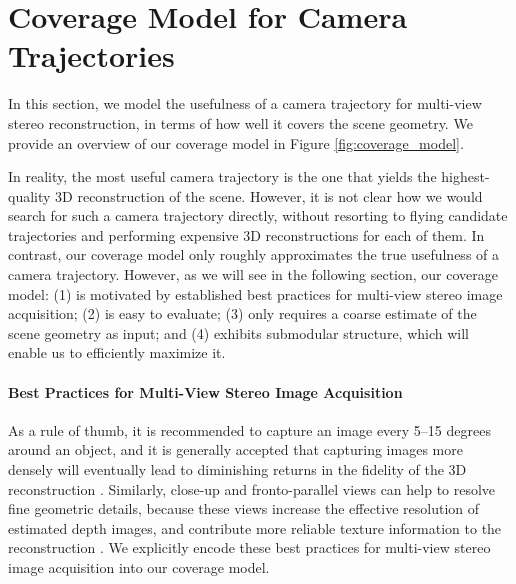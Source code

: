 \vspace{-5pt}
\section{Coverage Model for Camera Trajectories}
\label{sec:coverage_model}

In this section, we model the usefulness of a camera trajectory for multi-view stereo reconstruction, in terms of how well it covers the scene geometry.
We provide an overview of our coverage model in Figure \ref{fig:coverage_model}.

In reality, the most useful camera trajectory is the one that yields the highest-quality 3D reconstruction of the scene.
However, it is not clear how we would search for such a camera trajectory directly, without resorting to flying candidate trajectories and performing expensive 3D reconstructions for each of them.
In contrast, our coverage model only roughly approximates the true usefulness of a camera trajectory. 
However, as we will see in the following section, our coverage model: (1) is motivated by established best practices for multi-view stereo image acquisition; (2) is easy to evaluate; (3) only requires a coarse estimate of the scene geometry as input;  and (4) exhibits submodular structure, which will enable us to efficiently maximize it.

\vspace{-10pt}
\paragraph{Best Practices for Multi-View Stereo Image Acquisition}
As a rule of thumb, it is recommended to capture an image every 5--15 degrees around an object, and it is generally accepted that capturing images more densely will eventually lead to diminishing returns in the fidelity of the 3D reconstruction \cite{furukawa:2015}.
Similarly, close-up and fronto-parallel views can help to resolve fine geometric details, because these views increase the effective resolution of estimated depth images, and contribute more reliable texture information to the reconstruction \cite{waechter:2014}.
We explicitly encode these best practices for multi-view stereo image acquisition into our coverage model.

\vspace{-10pt}
